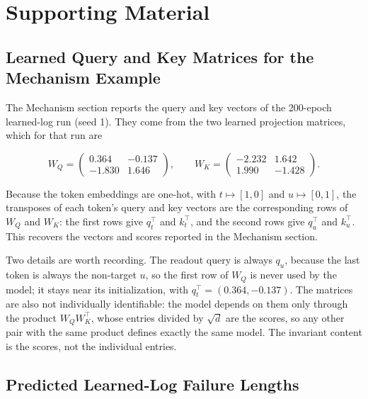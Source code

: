 \documentclass{article}
\begin{document}
\clearpage
\appendix

\section{Supporting Material}
\label{app:supporting-material}

\subsection{Learned Query and Key Matrices for the Mechanism Example}
\label{app:mechanism-matrices}

The Mechanism section reports the query and key vectors of the 200-epoch
learned-log run (seed 1). They come from the two learned projection matrices,
which for that run are

\begin{equation}
  W_Q=
  \begin{pmatrix}
     0.364 & -0.137\\
    -1.830 &  1.646
  \end{pmatrix},
  \qquad
  W_K=
  \begin{pmatrix}
    -2.232 &  1.642\\
     1.990 & -1.428
  \end{pmatrix}.
  \label{eq:learned-projection-matrices}
\end{equation}

Because the token embeddings are one-hot, with $t\mapsto[1,0]$ and
$u\mapsto[0,1]$, the transposes of each token's query and key vectors are the
corresponding rows of $W_Q$ and $W_K$: the first rows give $q_t^\top$ and
$k_t^\top$, and the second rows give $q_u^\top$ and $k_u^\top$. This recovers
the vectors and scores reported in the Mechanism section.

Two details are worth recording. The readout query is always $q_u$, because the
last token is always the non-target $u$, so the first row of $W_Q$ is never used
by the model; it stays near its initialization, with
$q_t^\top=(0.364,-0.137)$. The matrices are also not individually identifiable: the
model depends on them only through the product $W_QW_K^\top$, whose entries
divided by $\sqrt{d}$ are the scores, so any other pair with the same product
defines exactly the same model. The invariant content is the scores, not the
individual entries.

\subsection{Predicted Learned-Log Failure Lengths}
\label{app:failure-lengths}
\end{document}
